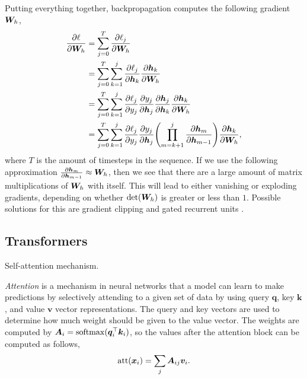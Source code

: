 Putting everything together, backpropagation computes the following gradient
\wrt $\bm{W}_h$,
\begin{align*}
  \pdv{\ell}{\mat{W}_h} &= \sum_{j=0}^T \pdv{\ell_j}{\mat{W}_h} \\
  &= \sum_{j=0}^T \sum_{k=1}^j \pdv{\ell_j}{\vec{h}_k} \pdv{\vec{h}_k}{\mat{W}_h} \\
  &= \sum_{j=0}^T \sum_{k=1}^j \pdv{\ell_j}{y_j} \pdv{y_j}{\vec{h}_j} \pdv{\vec{h}_j}{\vec{h}_k} \pdv{\vec{h}_k}{\mat{W}_h} \\
  &= \sum_{j=0}^T \sum_{k=1}^j \pdv{\ell_j}{y_j} \pdv{y_j}{\vec{h}_j} \lft( \prod_{m=k+1}^j \pdv{\vec{h}_m}{\vec{h}_{m-1}} \rgt) \pdv{\vec{h}_k}{\mat{W}_h}
,\end{align*}
where $T$ is the amount of timesteps in the sequence. If we use the following
approximation $\pdv{\bm{h}_m}{\bm{h}_{m-1}} \approx \bm{W}_h$, then we see
that there are a large amount of matrix multiplications of $\bm{W}_h$ with
itself. This will lead to either vanishing or exploding gradients, depending on
whether $\det{\mat{W}_h}$ is greater or less than $1$. Possible solutions for
this are gradient clipping and gated recurrent units
\citep{hochreiter1997long,cho2014learning}.

\subsection{Transformers}

\begin{marginfigure}
    \centering
    \caption{Self-attention mechanism.}
    \label{fig:attention}
\end{marginfigure}

\textit{Attention} is a mechanism in neural networks that a model can learn to
make predictions by selectively attending to a given set of data by using query
$\bm{q}$, key $\bm{k}$, and value $\bm{v}$ vector representations. The query
and key vectors are used to determine how much weight should be given to the
value vector. The weights are computed by
$\bm{A}_i=\mathrm{softmax}(\bm{q}_i^\top \bm{k}_i)$, so the values
after the attention block can be computed as follows, \[
  \mathrm{att}(\bm{x}_i) = \sum_{j} \bm{A}_{ij} \bm{v}_i
.\]


